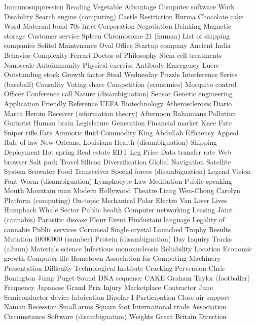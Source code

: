 Immunosuppression  Reading  Vegetable  
Advantage  Computer software  Work  
Disability  Search engine (computing)  Castle  
Restriction  Burma  Chocolate cake  
Word  Maternal bond  70s  
Intel Corporation  Negotiation  Drinking  
Magnetic storage  Customer service  Spleen  
Chromosome 21 (human)  List of shipping companies  Sofitel  
Maintenance  Oval Office  Startup company  
Ancient India  Behavior  Complexity  
Ferrari  Doctor of Philosophy  Stem cell treatments  
Nanoscale  Autoimmunity  Physical exercise  
Antibody  Emergency  Lucre  
Outstanding stock  Growth factor  Steal  
Wednesday  Puzzle  Interference  
Series (baseball)  Causality  Voting share  
Competition (economics)  Mosquito control  Officer  
Conference call  Nature (disambiguation)  Sensor  
Genetic engineering  Application  Friendly  
Reference  UEFA  Biotechnology  
Atherosclerosis  Diario Marca  Heroin  
Receiver (information theory)  Afternoon  Bahamians  
Pollution  Guitarist  Human brain  
Legislature  Generation  Financial market  
Knee  Fate  Sniper rifle  
Fats  Amniotic fluid  Commodity  
King Abdullah  Efficiency  Appeal  
Rule of law  New Orleans, Louisiana  Health (disambiguation)  
Shipping  Deployment  Hot spring  
Real estate  EDT  Leg  
Price  Data transfer rate  Web browser  
Salt pork  Travel  Silicon  
Diversification  Global Navigation Satellite System  Seawater  
Food  Transceiver  Special forces (disambiguation)  
Legend  Vision  Font  
Worm (disambiguation)  Lymphocyte  Law  
Meditation  Public speaking  Mouth  
Mountain man  Modern  Hollywood Theatre  
Liang Wen-Chong  Carolyn  Platform (computing)  
On-topic  Mechanical  Polar Electro  
Van  Liver  Lives  
Humpback Whale  Sector  Public health  
Computer networking  Leasing  Joint (cannabis)  
Parasitic disease  Flour  Event  
Hindustani language  Legality of cannabis  Public services  
Cornmeal  Single crystal  Launched  
Trophy  Results  Mutation  
10000000 (number)  Protein (disambiguation)  Day  
Inquiry  Tracks (album)  Materials science  
Infectious mononucleosis  Reliability  Location  
Economic growth  Computer file  Hometown  
Association for Computing Machinery  Presentation  Difficulty  
Technological Institute  Cracking  Perversion  
Chris Bonington  Jump  Puget Sound  
DNA sequence  CAKE  Graham Taylor (footballer)  
Frequency  Japanese Grand Prix  Injury  
Marketplace  Contractor  June  
Semiconductor device fabrication  Bipolar I  Participation  
Close air support  Naman  Recession  
Small arms  Square foot  International trade  
Association  Circumstance  Software (disambiguation)  
Weights  Great Britain  Direction  
